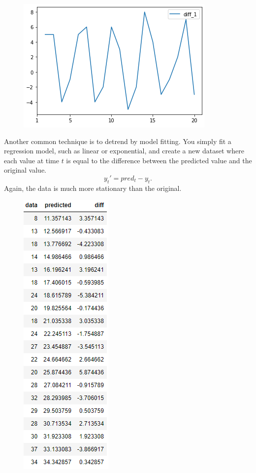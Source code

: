 \documentclass{article}
\begin{document}
\begin{flushleft}
\begin{figure}[H]
    \end{figure}
    \begin{figure}[H]
      \centering
      \includegraphics[scale=0.8]{diff_plot.png}
    \end{figure}
    Another common technique is to detrend by model fitting. You simply fit a regression model, such as linear or exponential, and create a new dataset where each value at time $t$ is equal to the difference between the predicted value and the original value. 
    \begin{equation*}
      y_t'=pred_t-y_t.
    \end{equation*}
    Again, the data is much more stationary than the original.
    \begin{figure}[H]
      \centering
      \includegraphics[scale=0.65]{regression_data.png}

\end{figure}
\end{flushleft}
\end{document}
